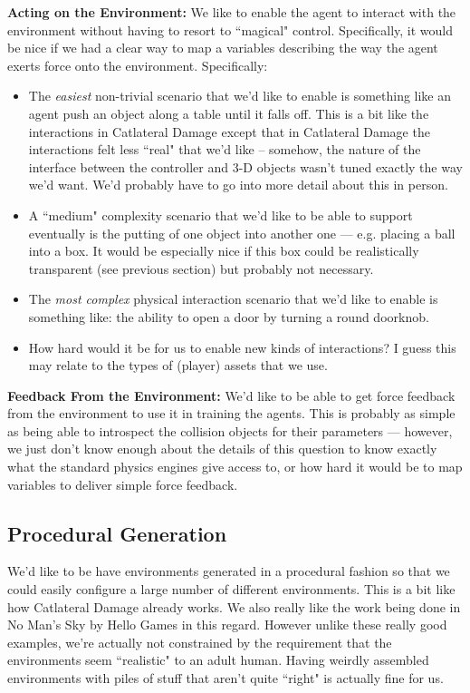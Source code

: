 \documentclass[12pt]{article}
\begin{document}
\textbf{Acting on the Environment:}  We like to enable the agent to interact with the environment without having to resort to ``magical" control.  Specifically, it would be nice if we had a clear way to map a variables describing the way the agent exerts force onto the environment.   Specifically: 
   \begin{itemize}
   	    \item The \emph{easiest} non-trivial scenario that we'd like to enable is something like an agent push an object along a table until it falls off.   This is a bit like the interactions in Catlateral Damage except that in Catlateral Damage the interactions felt less ``real" that we'd like -- somehow, the nature of the interface between the controller and 3-D objects wasn't tuned exactly the way we'd want.   We'd probably have to go into more detail about this in person.
   	    \item A ``medium" complexity scenario that we'd like to be able to support eventually is the putting of one object into another one --- e.g. placing a ball into a box.  It would be especially nice if this box could be realistically transparent (see previous section) but probably not necessary.
   	    \item The \emph{most complex}  physical interaction scenario that we'd like to enable is something like: the ability to open a door by turning a round doorknob.  
   	    \item  How hard would it be for us to enable new kinds of interactions?    I guess this may relate to the types of (player) assets that we use.  
   \end{itemize}
   
\noindent \textbf{Feedback From the Environment:} We'd like to be able to get force feedback from the environment to use it in training the agents.   This is probably as simple as being able to introspect the collision objects for their parameters --- however, we just don't know enough about the details of this question to know exactly what the standard physics engines give access to, or how hard it would be to map variables to deliver simple force feedback. 


\subsection*{Procedural Generation}

We'd like to be have environments generated in a procedural fashion so that we could easily configure a large number of different environments.  This is a bit like how Catlateral Damage already works.  We also really like the work being done in No Man's Sky by Hello Games in this regard.   However unlike these really good examples, we're actually not constrained by the requirement that the environments seem ``realistic" to an adult human.   Having weirdly assembled environments with piles of stuff that aren't quite ``right" is actually fine for us.   
\end{document}
